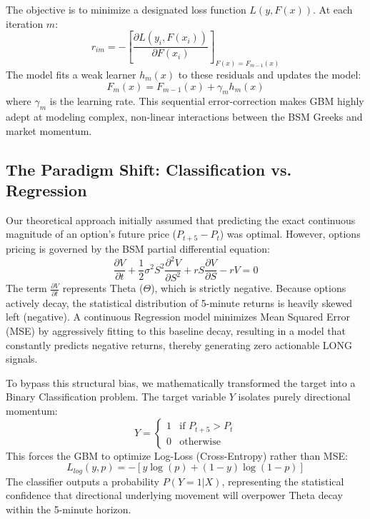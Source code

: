 \documentclass[11pt, a4paper]{article}
\begin{document}
The objective is to minimize a designated loss function $L(y, F(x))$. At each iteration $m$:
\begin{equation}
    r_{im} = - \left[ \frac{\partial L(y_i, F(x_i))}{\partial F(x_i)} \right]_{F(x) = F_{m-1}(x)}
\end{equation}
The model fits a weak learner $h_m(x)$ to these residuals and updates the model:
\begin{equation}
    F_m(x) = F_{m-1}(x) + \gamma_m h_m(x)
\end{equation}
where $\gamma_m$ is the learning rate. This sequential error-correction makes GBM highly adept at modeling complex, non-linear interactions between the BSM Greeks and market momentum.

\subsection{The Paradigm Shift: Classification vs. Regression}
Our theoretical approach initially assumed that predicting the exact continuous magnitude of an option's future price ($P_{t+5} - P_t$) was optimal. However, options pricing is governed by the BSM partial differential equation:
\begin{equation}
    \frac{\partial V}{\partial t} + \frac{1}{2}\sigma^2 S^2 \frac{\partial^2 V}{\partial S^2} + rS\frac{\partial V}{\partial S} - rV = 0
\end{equation}
The term $\frac{\partial V}{\partial t}$ represents Theta ($\Theta$), which is strictly negative. Because options actively decay, the statistical distribution of 5-minute returns is heavily skewed left (negative). A continuous Regression model minimizes Mean Squared Error (MSE) by aggressively fitting to this baseline decay, resulting in a model that constantly predicts negative returns, thereby generating zero actionable LONG signals.

To bypass this structural bias, we mathematically transformed the target into a Binary Classification problem. The target variable $Y$ isolates purely directional momentum:
\begin{equation}
    Y = 
    \begin{cases} 
      1 & \text{if } P_{t+5} > P_{t} \\
      0 & \text{otherwise}
    \end{cases}
\end{equation}
This forces the GBM to optimize Log-Loss (Cross-Entropy) rather than MSE:
\begin{equation}
    L_{log}(y, p) = - [y \log(p) + (1 - y) \log(1 - p)]
\end{equation}
The classifier outputs a probability $P(Y=1 | X)$, representing the statistical confidence that directional underlying movement will overpower Theta decay within the 5-minute horizon.
\end{document}
